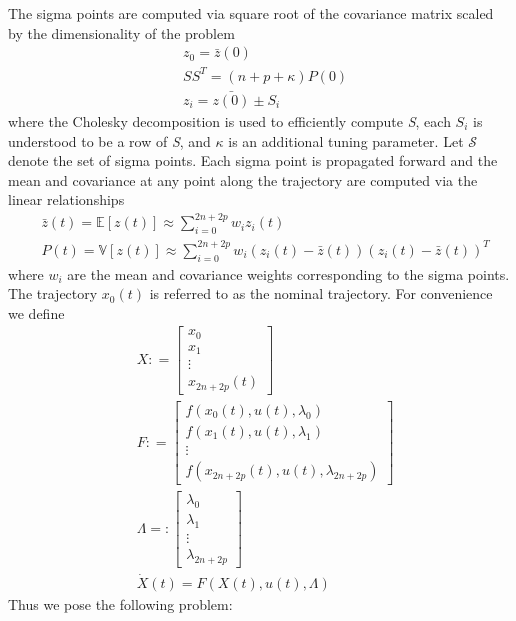 \documentclass[10pt,a4paper]{article}
\begin{document}
	The sigma points are computed via square root of the covariance matrix scaled by the dimensionality of the problem
	\begin{align}
	&z_0 = \bar{z}(0) \\
	&SS^T = (n+p+\kappa)P(0) \\
	&z_i = \bar{z(0)} \pm S_i 
	\end{align}
	where the Cholesky decomposition is used to efficiently compute \textit{S}, each $S_i$ is understood to be a row of \textit{S}, and $\kappa$ is an additional tuning parameter. Let $\mathcal{S}$ denote the set of sigma points. Each sigma point is propagated forward and the mean and covariance at any point along the trajectory are computed via the linear relationships
	\begin{align}
	&\bar{z}(t) = \mathbb{E}[z(t)] \approx \sum_{i=0}^{2n+2p}w_iz_i(t) \\
	&P(t) = \mathbb{V}[z(t)] \approx \sum_{i=0}^{2n+2p}w_i(z_i(t) - \bar{z}(t))(z_i(t) - \bar{z}(t))^T
	\end{align}
	where $w_i$ are the mean and covariance weights corresponding to the sigma points. The trajectory $x_0(t)$ is referred to as the nominal trajectory. For convenience we define
	\begin{align}
	&X \mathrel{:}= \left[\begin{array}{c}
	x_0\\
	x_1\\
	\vdots\\
	x_{2n+2p}(t)
	\end{array}\right] \\
	&F \mathrel{:}= \left[\begin{array}{c}
		f(x_0(t),u(t),\lambda_0)\\
		f(x_1(t),u(t),\lambda_1)\\
		\vdots \\
		f(x_{2n+2p}(t),u(t),\lambda_{2n+2p}) 
		\end{array}\right] \\
	&\Lambda = \mathrel{:}\left[\begin{array}{c}
			\lambda_0\\
			\lambda_1\\
			\vdots\\
			\lambda_{2n+2p}\end{array}\right] \\
	&\dot{X}(t) = F(X(t),u(t),\Lambda)	
	\end{align}
	Thus we pose the following problem:
\end{document}
